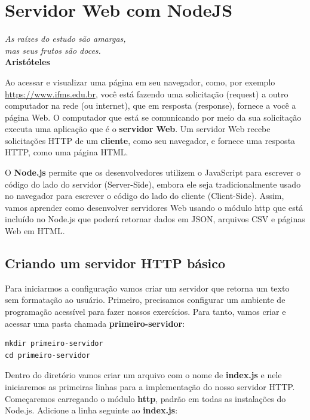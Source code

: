 \chapter{Servidor Web com NodeJS}\label{cap:cap_03}

\begin{flushright}
	\textit{
		As raízes do estudo são amargas, \\ mas seus frutos são doces.
	} \\
	\textbf{Aristóteles}
\end{flushright}

Ao acessar e visualizar uma página em seu navegador, como, por exemplo \url{https://www.ifms.edu.br}, você está fazendo uma solicitação (request) a outro computador na rede (ou internet), que em resposta (response), fornece a você a página Web. O computador que está se comunicando por meio da sua solicitação executa uma aplicação que é o \textbf{servidor Web}. Um servidor Web recebe solicitações HTTP de um \textbf{cliente}, como seu navegador, e fornece uma resposta HTTP, como uma página HTML.

O \textbf{Node.js} permite que os desenvolvedores utilizem o JavaScript para escrever o código do lado do servidor (Server-Side), embora ele seja tradicionalmente usado no navegador para escrever o código do lado do cliente (Client-Side). Assim, vamos aprender como desenvolver servidores Web usando o módulo http que está incluído no Node.js que poderá retornar dados em JSON, arquivos CSV e páginas Web em HTML.

\section{Criando um servidor HTTP básico}

Para iniciarmos a configuração vamos criar um servidor que retorna um texto sem formatação ao usuário. Primeiro, precisamos configurar um ambiente de programação acessível para fazer nossos exercícios. Para tanto, vamos criar e acessar uma pasta chamada \textbf{primeiro-servidor}:

\begin{verbatim}
mkdir primeiro-servidor
cd primeiro-servidor
\end{verbatim}

Dentro do diretório vamos criar um arquivo com o nome de \textbf{index.js} e nele iniciaremos as primeiras linhas para a implementação do nosso servidor HTTP. Começaremos carregando o módulo \textbf{http}, padrão em todas as instalações do Node.js. Adicione a linha seguinte ao \textbf{index.js}:

